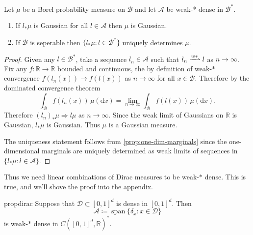 \documentclass[fontsize=12pt, DIV=10]{scrreprt}
\theoremstyle{remark}
\newcommand{\defeq}{\coloneqq}
\newcommand{\R}{\mathbb R}
\newcommand{\calA}{\mathcal A}
\newcommand{\calB}{\mathcal B}
\newcommand{\calD}{\mathcal D}
\newcommand{\dif}[1]{\text{d} #1}
\newcommand{\towk}{\Rightarrow}
\DeclareMathOperator{\spn}{span}
\newcommand{\unitbox}{\ensuremath{[0,1]^d}}
\begin{document}
\begin{prop}
	\label{prop:weak-star-suff}
	Let $\mu$ be a Borel probability measure on $\calB$ and let $\calA$ be weak-* dense in $\calB^*$. 
	\begin{enumerate}
		\item If $l_* \mu$ is Gaussian for all $l \in \calA$ then $\mu$ is Gaussian.
		\item If $\calB$ is seperable then $\{l_* \mu : l \in \calB^*\}$ uniquely determines $\mu$.
	\end{enumerate}
\end{prop}
\begin{proof}
	Given any $l \in \calB^*$, take a sequence $l_n \in \calA$ such that $l_n \xrightharpoonup{w*} l$ as $n \to \infty$. Fix any $f: \R \to \R$ bounded and continuous, the by definition of weak-$*$ convergence $f(l_n(x)) \to f(l(x))$ as $n \to \infty$ for all $x \in \calB$. Therefore by the dominated convergence theorem
	\begin{equation}
		\int_{\calB} f(l_n(x)) \, \mu(\dif x) = \lim_{n \to \infty} \int_{\calB} f(l(x)) \, \mu(\dif x).
	\end{equation}
	Therefore $(l_n)_* \mu \towk l \mu$ as $n \to \infty$. Since the weak limit of Gaussians on $\R$ is Gaussian, $l_* \mu$ is Gaussian. Thus $\mu$ is a Gaussian measure.


	The uniqueness statement follows from \vref{prop:one-dim-marginals} since the one-dimensional marginals are uniquely determined as weak limits of sequences in $\{l_* \mu : l \in \calA\}$.
\end{proof}

Thus we need linear combinations of Dirac measures to be weak-$*$ dense. This is true, and we'll shove the proof into the appendix.
\begin{restatable}{prop}{dirac}
	\label{prop:dirac-density}
	Suppose that $\calD \subset \unitbox$ is dense in $\unitbox$. Then 
	\begin{equation}
		\calA \defeq \spn\{\delta_x : x \in \calD\}
	\end{equation}
	is weak-$*$ dense in $C(\unitbox, \R)^*$.
\end{restatable}
\end{document}

